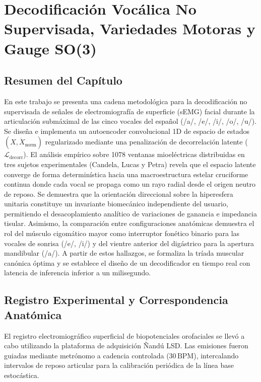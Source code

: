\documentclass[11pt,a4paper,openany]{book}
\theoremstyle{definition}
\begin{document}
\chapter{Decodificación Vocálica No Supervisada, Variedades Motoras y Gauge SO(3)}
\label{chap:autoencoder_gauge_3d}



\section*{Resumen del Capítulo}
En este trabajo se presenta una cadena metodológica para la decodificación no supervisada de señales de electromiografía de superficie (sEMG) facial durante la articulación submáximal de las cinco vocales del español (/a/, /e/, /i/, /o/, /u/). Se diseña e implementa un autoencoder convolucional 1D de espacio de estados $(X, \dot{X}_{\text{norm}})$ regularizado mediante una penalización de decorrelación latente ($\mathcal{L}_{\text{decorr}}$). El análisis empírico sobre 1078 ventanas mioeléctricas distribuidas en tres sujetos experimentales (Candela, Lucas y Petra) revela que el espacio latente converge de forma determinística hacia una macroestructura estelar cruciforme continua donde cada vocal se propaga como un rayo radial desde el origen neutro de reposo. Se demuestra que la orientación direccional sobre la hiperesfera unitaria constituye un invariante biomecánico independiente del usuario, permitiendo el desacoplamiento analítico de variaciones de ganancia e impedancia tisular. Asimismo, la comparación entre configuraciones anatómicas demuestra el rol del músculo cigomático mayor como interruptor fonético binario para las vocales de sonrisa (/e/, /i/) y del vientre anterior del digástrico para la apertura mandibular (/a/). A partir de estos hallazgos, se formaliza la tríada muscular canónica óptima y se establece el diseño de un decodificador en tiempo real con latencia de inferencia inferior a un milisegundo.


\vspace{0.5cm}

\section{Registro Experimental y Correspondencia Anatómica}
\label{sec:registro_experimental}

El registro electromiográfico superficial de biopotenciales orofaciales se llevó a cabo utilizando la plataforma de adquisición Ñandú LSD. Las emisiones fueron guiadas mediante metrónomo a cadencia controlada ($30\,\text{BPM}$), intercalando intervalos de reposo articular para la calibración periódica de la línea base estocástica.
\end{document}
